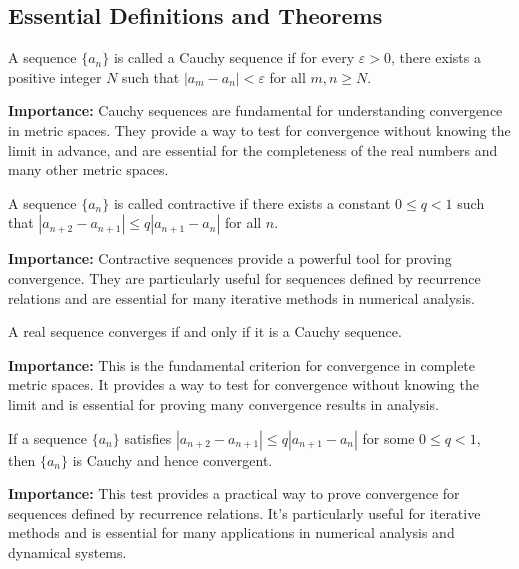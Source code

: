 \subsection*{Essential Definitions and Theorems}

\begin{definition}
A sequence $\{a_n\}$ is called a Cauchy sequence if for every $\varepsilon > 0$, there exists a positive integer $N$ such that $|a_m - a_n| < \varepsilon$ for all $m, n \geq N$.
\end{definition}

\noindent\textbf{Importance:} Cauchy sequences are fundamental for understanding convergence in metric spaces. They provide a way to test for convergence without knowing the limit in advance, and are essential for the completeness of the real numbers and many other metric spaces.



\begin{definition}
A sequence $\{a_n\}$ is called contractive if there exists a constant $0 \leq q < 1$ such that $|a_{n+2} - a_{n+1}| \leq q|a_{n+1} - a_n|$ for all $n$.
\end{definition}

\noindent\textbf{Importance:} Contractive sequences provide a powerful tool for proving convergence. They are particularly useful for sequences defined by recurrence relations and are essential for many iterative methods in numerical analysis.



\begin{theorem}
A real sequence converges if and only if it is a Cauchy sequence.
\end{theorem}

\noindent\textbf{Importance:} This is the fundamental criterion for convergence in complete metric spaces. It provides a way to test for convergence without knowing the limit and is essential for proving many convergence results in analysis.



\begin{theorem}
If a sequence $\{a_n\}$ satisfies $|a_{n+2} - a_{n+1}| \leq q|a_{n+1} - a_n|$ for some $0 \leq q < 1$, then $\{a_n\}$ is Cauchy and hence convergent.
\end{theorem}

\noindent\textbf{Importance:} This test provides a practical way to prove convergence for sequences defined by recurrence relations. It's particularly useful for iterative methods and is essential for many applications in numerical analysis and dynamical systems.



